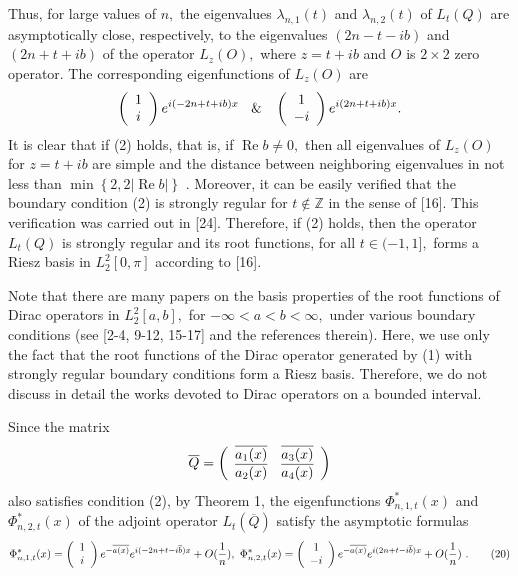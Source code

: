 \documentclass{article}%
\begin{document}
Thus, for large values of $n,$ the eigenvalues $\lambda_{n,1}(t)$ and
$\lambda_{n,2}(t)$ of $L_{t}(Q)$ are asymptotically close, respectively, to
the eigenvalues $(2n-t-ib)$ and $(2n+t+ib)$ of the operator $L_{z}(O),$ where
$z=t+ib$ and $O$ is $2\times2$ zero operator. The corresponding eigenfunctions
of $L_{z}(O)$ are
\[
\left(
\begin{array}
[c]{c}%
1\\
i
\end{array}
\right)  e^{i(-2n+t+ib)x}\text{ }\And\text{ }\left(
\begin{array}
[c]{c}%
1\\
-i
\end{array}
\right)  e^{i(2n+t+ib)x}.
\]
It is clear that if (2) holds, that is, if $\operatorname{Re}b\neq0,$ then all
eigenvalues of $L_{z}(O)$ for $z=t+ib$ are simple and the distance between
neighboring eigenvalues in not less than $\min\left\{  2,2\left\vert
\operatorname{Re}b\right\vert \right\}  $ . Moreover, it can be easily
verified that the boundary condition (2) is strongly regular for
$t\notin\mathbb{Z}$ in the sense of [16]. This verification was carried out in
[24]. Therefore, if (2) holds, then the operator $L_{t}(Q)$ is strongly
regular and its root functions, for all $t\in(-1,1],$ forms a Riesz basis in
$L_{2}^{2}[0,\pi]$ according to [16].

Note that there are many papers on the basis properties of the root functions
of Dirac operators in $L_{2}^{2}[a,b],$ for $-\infty<a<b<\infty,$ under
various boundary conditions (see [2-4, 9-12, 15-17] and the references
therein). Here, we use only the fact that the root functions of the Dirac
operator generated by (1) with strongly regular boundary conditions form a
Riesz basis. Therefore, we do not discuss in detail the works devoted to Dirac
operators on a bounded interval.\ 

Since the matrix
\[
\overline{Q}=\left(
\begin{array}
[c]{cc}%
\overline{a_{1}(x)} & \overline{a_{3}(x)}\\
\overline{a_{2}(x)} & \overline{a_{4}(x)}%
\end{array}
\right)
\]
also satisfies condition (2), by Theorem 1, the eigenfunctions $\Phi
_{n,1,t}^{\ast}(x)$ and $\Phi_{n,2,t}^{\ast}(x)$ of the adjoint operator
$L_{t}(\overline{Q})$ satisfy the asymptotic formulas%
\begin{equation}
\Phi_{n,1,t}^{\ast}(x)=\left(
\begin{array}
[c]{c}%
1\\
i
\end{array}
\right)  e^{-\overline{a(x)}}e^{i(-2n+t-i\overline{b})x}+O(\frac{1}{n}),\text{
}\Phi_{n,2,t}^{\ast}(x)=\left(
\begin{array}
[c]{c}%
1\\
-i
\end{array}
\right)  e^{-\overline{a(x)}}e^{i(2n+t-i\overline{b})x}+O(\frac{1}{n})\text{
}. \tag{20}%
\end{equation}
\end{document}
